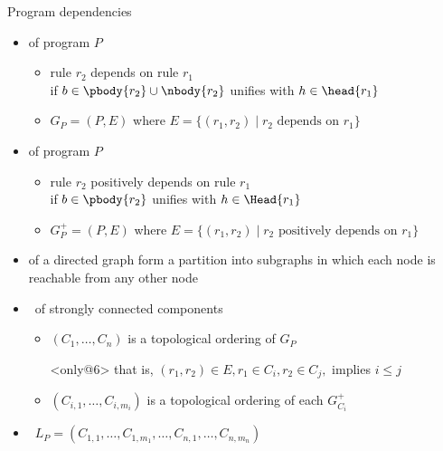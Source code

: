 \begin{frame}{Program dependencies}
  \smallskip
  \begin{itemize}
  \item<1->  of program \(P\)
    \begin{itemize}\normalsize
    \item<only@-2> rule \(r_2\) \alert{depends} on rule \(r_1\)
      \\if \(b\in\pbody{r_2}\cup\nbody{r_2}\) unifies with \(h\in\head{r_1}\)
      \smallskip
    \item \(G_P=(P,E)\) where \(E=\{ (r_1,r_2) \mid r_2 \text{ depends on } r_1 \}\)
    \end{itemize}
    \medskip
  \item<2->  of program \(P\)
    \begin{itemize}\normalsize
    \item<only@-2> rule \(r_2\) \alert{positively depends} on rule \(r_1\)
      \\if \(b\in\pbody{r_2}\) unifies with \(h\in\Head{r_1}\)
      \smallskip
    \item \(G^+_P=(P,E)\) where \(E=\{ (r_1,r_2) \mid r_2 \text{ positively depends on } r_1 \}\)
    \end{itemize}
    \medskip
  \item<only@4->  of a directed graph form a partition into subgraphs
    in which each node is reachable from any other node
    \medskip
  \item<only@5->  \
    of strongly connected components
    \begin{itemize}\normalsize
    \item<6-> \((C_1,\dots,C_n)\) is a topological ordering of \(G_P\)\only<6>{,}
      \smallskip
    \item[]<only@6>
      that is,
      \(
      (r_1,r_2)\in E,
      r_1\in C_i,
      r_2\in C_j,
      \)
      implies
      \(
      i\leq j\)
      \smallskip
    \item<only@7-> \((C_{i,1},\dots,C_{i,m_i})\) is a topological ordering of each \(G^+_{C_i}\)
    \end{itemize}
  \item<only@8->[]\structure{\itarrow} \
    \(
    L_P = (C_{1,1},\dots,C_{1,m_1},\dots,C_{n,1},\dots,C_{n,m_n})
    \)
  \end{itemize}
\end{frame}
